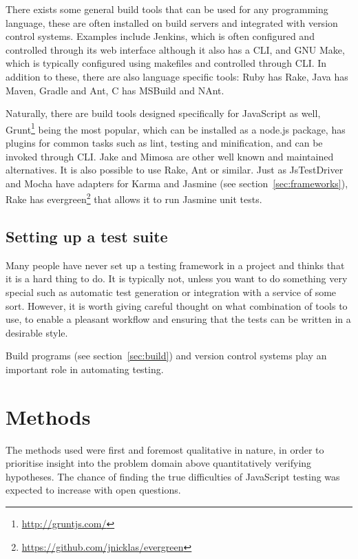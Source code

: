 \documentclass[11pt]{article}
\begin{document}
There exists some general build tools that can be used for any programming language, these are often installed on build servers and integrated with version control systems. Examples include Jenkins, which is often configured and controlled through its web interface although it also has a CLI, and GNU Make, which is typically configured using makefiles and controlled through CLI. In addition to these, there are also language specific tools: Ruby has Rake, Java has Maven, Gradle and Ant, C\nolinebreak\hspace{-.05em}\raisebox{.3ex}{\scriptsize\bf \#} has MSBuild and NAnt.

Naturally, there are build tools designed specifically for JavaScript as well, Grunt\footnote{\url{http://gruntjs.com/}} being the most popular, which can be installed as a node.js package, has plugins for common tasks such as lint, testing and minification, and can be invoked through CLI. \cite[question~52]{Edelstam} Jake and Mimosa are other well known and maintained alternatives. It is also possible to use Rake, Ant or similar. Just as JsTestDriver and Mocha have adapters for Karma and Jasmine (see section~\ref{sec:frameworks}), Rake has evergreen\footnote{\url{https://github.com/jnicklas/evergreen}} that allows it to run Jasmine unit tests. \cite{BuildTools}\cite[question~6]{Ahnve}

\subsection{Setting up a test suite}

Many people have never set up a testing framework in a project and thinks that it is a hard thing to do. It is typically not, unless you want to do something very special such as automatic test generation or integration with a service of some sort. However, it is worth giving careful thought on what combination of tools to use, to enable a pleasant workflow and ensuring that the tests can be written in a desirable style.

Build programs (see section~\ref{sec:build}) and version control systems play an important role in automating testing.


\section{Methods}

The methods used were first and foremost qualitative in nature, in order to prioritise insight into the problem domain above quantitatively verifying hypotheses. The chance of finding the true difficulties of JavaScript testing was expected to increase with open questions.
\end{document}
